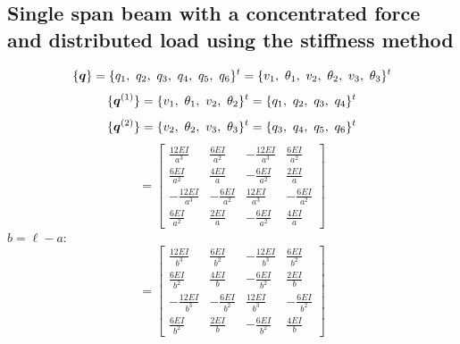 \documentclass[11pt, oneside]{article}   	%
\newcommand{\vectr}[1]{\hbox{\boldmath$#1$}}
\begin{document}
\subsection{Single span beam with a concentrated force and distributed load using the stiffness method}

\begin{equation}
   \{ \vectr{q} \}  = \{ q_1,~ q_2,~ q_3,~ q_4,~ q_5,~ q_6 \}^t = \{ v_1,~ \theta_1,~ v_2,~ \theta_2,~ v_3,~ \theta_3\}^t
   \label{D1}
\end{equation}
\begin{equation}
   \{ \vectr{q}^{(1)} \} = \{ v_1,~ \theta_1,~ v_2,~ \theta_2\}^t = \{ q_1,~ q_2,~ q_3,~ q_4 \}^t
   \label{D2}
\end{equation}
\begin{equation}
   \{ \vectr{q}^{(2)} \} = \{  v_2,~ \theta_2,~ v_3,~ \theta_3\}^t = \{  q_3,~ q_4,~ q_5,~ q_6 \}^t
   \label{D3}
\end{equation}
\begin{equation}
   [ \vectr{K}^{(1)} ] =
   \left[
   \begin{array}{cccc}
    \frac{12 {EI} }{a^3} & \frac{6 {EI} }{a^2} & -\frac{12 {EI} }{a^3} & \frac{6 {EI} }{a^2} \\[2ex]
    \frac{6 {EI}}{a^2} & \frac{4 {EI}}{a} & -\frac{6 {EI}}{a^2} & \frac{2 {EI}}{a} \\[2ex]
    -\frac{12 {EI} }{a^3} & -\frac{6 {EI} }{a^2} & \frac{12 {EI} }{a^3} & -\frac{6 {EI} }{a^2} \\[2ex]
    \frac{6 {EI}}{a^2} & \frac{2 {EI}}{a} &  -\frac{6 {EI}}{a^2}  &  \frac{4 {EI}}{a}
   \end{array}
   \right]
   \label{D4}
\end{equation}
$b=\ell-a$:
\begin{equation}
   [ \vectr{K}^{(2)} ] =
   \left[
   \begin{array}{cccc}
    \frac{12 {EI} }{b^3} & \frac{6 {EI} }{b^2} & -\frac{12 {EI} }{b^3} & \frac{6 {EI} }{b^2} \\[2ex]
    \frac{6 {EI}}{b^2} & \frac{4 {EI}}{b} & -\frac{6 {EI}}{b^2} & \frac{2 {EI}}{b} \\[2ex]
    -\frac{12 {EI} }{b^3} & -\frac{6 {EI} }{b^2} & \frac{12 {EI} }{b^3} & -\frac{6 {EI} }{b^2} \\[2ex]
    \frac{6 {EI}}{b^2} & \frac{2 {EI}}{b} &  -\frac{6 {EI}}{b^2}  &  \frac{4 {EI}}{b}
   \end{array}
   \right]
   \label{D5}
\end{equation}
\end{document}
